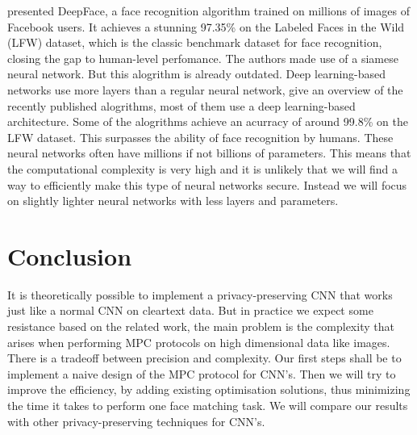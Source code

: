 \cite{taigman2014deepface} presented DeepFace, a face recognition algorithm trained on millions of images of Facebook users. It achieves a stunning 97.35\% on the Labeled Faces in the Wild (LFW) dataset, which is the classic benchmark dataset for face recognition, closing the gap to human-level perfomance. The authors made use of a siamese neural network. But this alogrithm is already outdated. Deep learning-based networks use more layers than a regular neural network, \cite{wang2018deep} give an overview of the recently published alogrithms, most of them use a deep learning-based architecture. Some of the alogrithms achieve an acurracy of around 99.8\% on the LFW dataset. This surpasses the ability of face recognition by humans. These neural networks often have millions if not billions of parameters. This means that the computational complexity is very high and it is unlikely that we will find a way to efficiently make this type of neural networks secure. Instead we will focus on slightly lighter neural networks with less layers and parameters.

\section{Conclusion}
It is theoretically possible to implement a privacy-preserving CNN that works just like a normal CNN on cleartext data. But in practice we expect some resistance based on the related work, the main problem is the complexity that arises when performing MPC protocols on high dimensional data like images. There is a tradeoff between precision and complexity. Our first steps shall be to implement a naive design of the MPC protocol for CNN's. Then we will try to improve the efficiency, by adding existing optimisation solutions, thus minimizing the time it takes to perform one face matching task. We will compare our results with other privacy-preserving techniques for CNN's.
